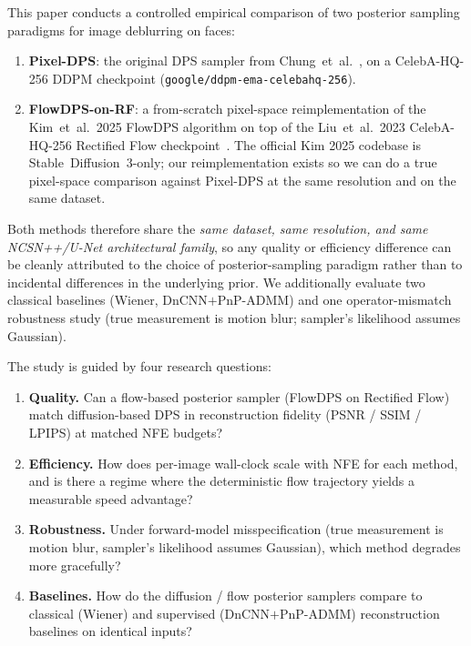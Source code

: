 \documentclass{article}
\begin{document}
This paper conducts a controlled empirical comparison of two posterior
sampling paradigms for image deblurring on faces:
\begin{enumerate}[leftmargin=*,itemsep=2pt]
  \item \textbf{Pixel-DPS}: the original DPS sampler from
    Chung~et~al.~\cite{chung2023dps}, on a CelebA-HQ-256 DDPM checkpoint
    (\texttt{google/ddpm-ema-celebahq-256}).
  \item \textbf{FlowDPS-on-RF}: a from-scratch pixel-space
    reimplementation of the Kim~et~al.~2025 FlowDPS algorithm on top of
    the Liu~et~al.~2023 CelebA-HQ-256 Rectified Flow
    checkpoint~\cite{liu2023rectified}. The official Kim 2025 codebase is
    Stable~Diffusion~3-only; our reimplementation exists so we can do a
    true pixel-space comparison against Pixel-DPS at the same resolution
    and on the same dataset.
\end{enumerate}

Both methods therefore share the \emph{same dataset, same resolution, and
same NCSN++/U-Net architectural family}, so any quality or efficiency
difference can be cleanly attributed to the choice of posterior-sampling
paradigm rather than to incidental differences in the underlying prior.
We additionally evaluate two classical baselines (Wiener,
DnCNN$+$PnP-ADMM) and one operator-mismatch robustness study (true
measurement is motion blur; sampler's likelihood assumes Gaussian).

The study is guided by four research questions:
\begin{enumerate}[leftmargin=*,itemsep=2pt]
  \item \textbf{Quality.} Can a flow-based posterior sampler (FlowDPS on
    Rectified Flow) match diffusion-based DPS in reconstruction
    fidelity (PSNR / SSIM / LPIPS) at matched NFE budgets?
  \item \textbf{Efficiency.} How does per-image wall-clock scale with
    NFE for each method, and is there a regime where the deterministic
    flow trajectory yields a measurable speed advantage?
  \item \textbf{Robustness.} Under forward-model misspecification (true
    measurement is motion blur, sampler's likelihood assumes Gaussian),
    which method degrades more gracefully?
  \item \textbf{Baselines.} How do the diffusion / flow posterior
    samplers compare to classical (Wiener) and supervised
    (DnCNN$+$PnP-ADMM) reconstruction baselines on identical inputs?
\end{enumerate}
\end{document}
